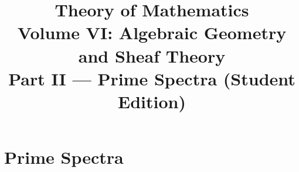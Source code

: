 \documentclass[11pt,a4paper,oneside,openany]{book}
\title{Theory of Mathematics\\[0.5em]\Large Volume VI: Algebraic Geometry and Sheaf Theory\\[0.4em]\normalsize Part II --- Prime Spectra (Student Edition)}
\author{}\date{}
\begin{document}
\maketitle\clearpage
\frontmatter\tableofcontents
\mainmatter
\part{Prime Spectra}






\end{document}
